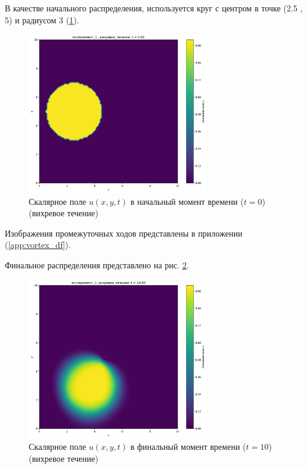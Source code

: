 В качестве начального распределения, используется круг с центром в точке (2.5 , 5) и радиусом 3 (\ref{fig:vortex_begin}).
\begin{figure}
	\centering
	\includegraphics[width=0.7\textwidth]{imgs/эксперимент_1:_вихревое_течение_t0.00.png}
	\caption{Скалярное поле \(u(x,y,t)\) в начальный момент времени ($t=0$) (вихревое течение)}
	\label{fig:vortex_begin}
\end{figure}

Изображения промежуточных ходов представлены в приложении (\ref{app:vortex_df}).

Финальное распределения  представлено на рис. \ref{fig:vortex_final}.
\begin{figure}
	\centering
	\includegraphics[width=0.7\textwidth]{imgs/эксперимент_1:_вихревое_течение_t10.00.png}
	\caption{Скалярное поле \(u(x,y,t)\) в финальный момент времени ($t=10$) (вихревое течение)}
	\label{fig:vortex_final}
\end{figure}


